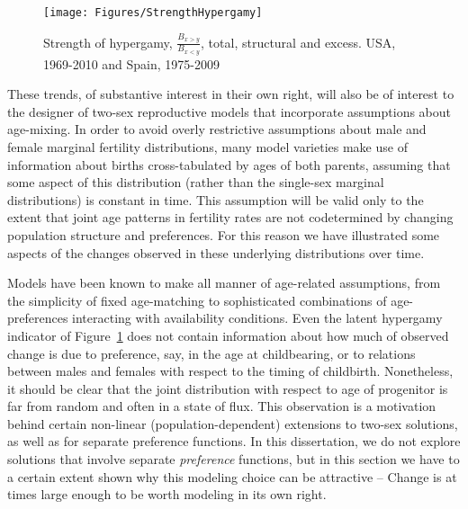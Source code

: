 \begin{figure}[!ht]
  \centering
    \caption{Strength of hypergamy, $\frac{B_{x>y}}{B_{x<y}}$, total, structural
    and excess. USA, 1969-2010 and Spain, 1975-2009}
    \texttt{[image: Figures/StrengthHypergamy]}      
    \label{fig:HypergamyStrength}
\end{figure}

These trends, of substantive interest in their own right, will also be of
interest to the designer of two-sex reproductive models that incorporate
 assumptions about age-mixing. In order to avoid overly restrictive
 assumptions about male and female marginal fertility distributions, many
 model varieties make use of information about births cross-tabulated by
 ages of both parents, assuming that some aspect of this distribution
 (rather than the single-sex marginal distributions) is constant in time.
 This assumption will be valid only to the extent that joint age patterns in
 fertility rates are not codetermined by changing population structure and
 preferences. For this reason we have illustrated some aspects of the changes 
 observed in these underlying distributions over time. 
 
Models have been
 known to make all manner of age-related assumptions, from the simplicity of 
 fixed age-matching to sophisticated combinations of age-preferences 
 interacting with availability conditions. Even the latent hypergamy 
 indicator of Figure~\ref{fig:HypergamyStrength} does not contain information 
 about how much of observed change is due to preference, say, in the age at 
 childbearing, or to relations between males and females with respect to the
 timing of childbirth. Nonetheless, it should be clear that the joint distribution
with respect to age of progenitor is far from random and often in a state of
flux. This observation is a motivation behind certain non-linear
(population-dependent) extensions to two-sex solutions, as well as for separate
preference functions. In this dissertation, we do not explore solutions that
involve separate \textit{preference} functions, but in this section we have to a
certain extent shown why this modeling choice can be attractive -- Change is at
times large enough to be worth modeling in its own right.
